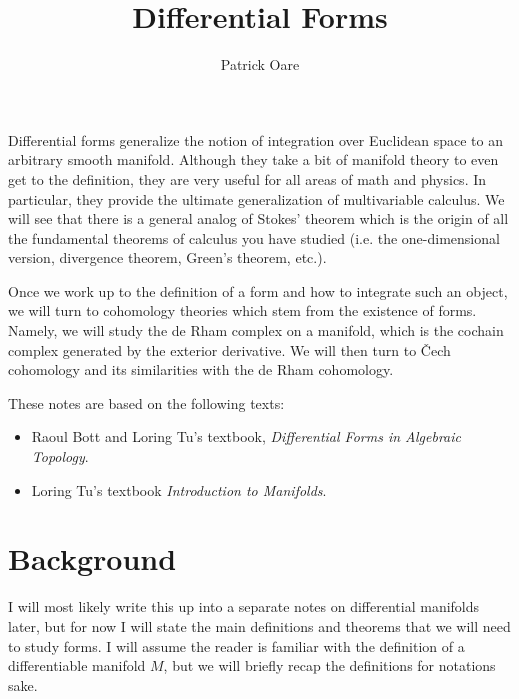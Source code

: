 \def \root {../../..}			%


\title{Differential Forms}
\author{Patrick Oare}
\date{}							%


\maketitle

Differential forms generalize the notion of integration over Euclidean space to an arbitrary smooth manifold. Although they take 
a bit of manifold theory to even get to the definition, they are very useful for all areas of math and physics. In particular, they 
provide the ultimate generalization of multivariable calculus. We will see that there is a general analog of Stokes' theorem which 
is the origin of all the fundamental theorems of calculus you have studied (i.e. the one-dimensional version, divergence theorem, 
Green's theorem, etc.). 

Once we work up to the definition of a form and how to integrate such an object, we will turn to cohomology theories which 
stem from the existence of forms. Namely, we will study the de Rham complex on a manifold, which is the cochain complex 
generated by the exterior derivative. We will then turn to \v{C}ech cohomology and its similarities with the de Rham 
cohomology. 

\begin{resources}
These notes are based on the following texts:
\begin{itemize}
	\item Raoul Bott and Loring Tu's textbook, \textit{Differential Forms in Algebraic Topology}. 
	\item Loring Tu's textbook \textit{Introduction to Manifolds}.
\end{itemize}
\end{resources}

\newpage
\section{Background}

I will most likely write this up into a separate notes on differential manifolds later, but for now I will state the main definitions 
and theorems that we will need to study forms. I will assume the reader is familiar with the definition of a differentiable 
manifold $M$, but we will briefly recap the definitions for notations sake. 

